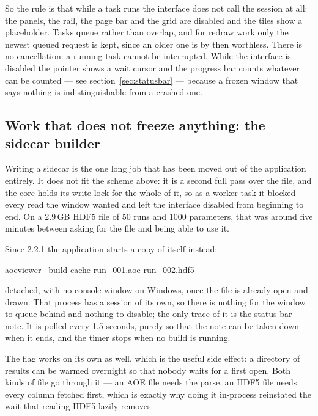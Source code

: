 \documentclass[11pt,a4paper,oneside]{report}
\newcommand{\appver}{2.2.1}
\begin{document}
So the rule is that while a task runs the interface does not call the session at
all: the panels, the rail, the page bar and the grid are disabled and the tiles
show a placeholder. Tasks queue rather than overlap, and for redraw work only
the newest queued request is kept, since an older one is by then worthless.
There is no cancellation: a running task cannot be interrupted. While the
interface is disabled the pointer shows a wait cursor and the progress bar
counts whatever can be counted --- see section~\ref{sec:statusbar} --- because
a frozen window that says nothing is indistinguishable from a crashed one.

\subsection{Work that does not freeze anything: the sidecar builder}

Writing a sidecar is the one long job that has been moved out of the
application entirely. It does not fit the scheme above: it is a second full pass
over the file, and the core holds its write lock for the whole of it, so as a
worker task it blocked every read the window wanted and left the interface
disabled from beginning to end. On a 2.9\,GB HDF5 file of 50 runs and 1000
parameters, that was around five minutes between asking for the file and being
able to use it.

Since \appver{} the application starts a copy of itself instead:

\begin{aoecode}
aoeviewer --build-cache run_001.aoe run_002.hdf5
\end{aoecode}

detached, with no console window on Windows, once the file is already open and
drawn. That process has a session of its own, so there is nothing for the window
to queue behind and nothing to disable; the only trace of it is the status-bar
note. It is polled every 1.5 seconds, purely so that the note can be taken down
when it ends, and the timer stops when no build is running.

The flag works on its own as well, which is the useful side effect: a directory
of results can be warmed overnight so that nobody waits for a first open. Both
kinds of file go through it --- an AOE file needs the parse, an HDF5 file needs
every column fetched first, which is exactly why doing it in-process reinstated
the wait that reading HDF5 lazily removes.
\end{document}
